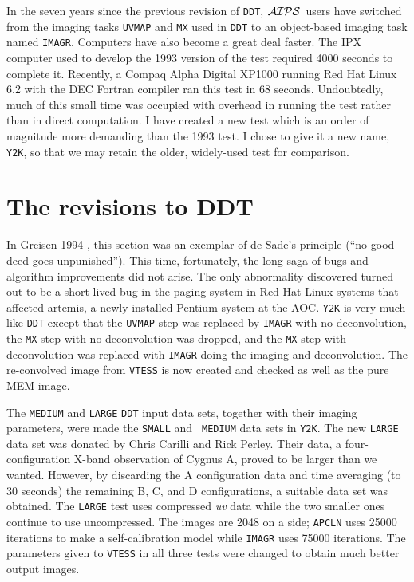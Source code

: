 \documentclass[twoside]{article}
\newcommand{\AIPS}{{$\cal AIPS\/$}}
\begin{document}
In the seven years since the previous revision of {\tt DDT}, \AIPS\
users have switched from the imaging tasks {\tt UVMAP} and {\tt MX}
used in {\tt DDT} to an object-based imaging task named {\tt IMAGR}\@.
Computers have also become a great deal faster.  The IPX computer used
to develop the 1993 version of the test required 4000 seconds to
complete it.  Recently, a Compaq Alpha Digital XP1000 running Red Hat
Linux 6.2 with the DEC Fortran compiler ran this test in 68 seconds.
Undoubtedly, much of this small time was occupied with overhead in
running the test rather than in direct computation.  I have created a
new test which is an order of magnitude more demanding than the 1993
test.  I chose to give it a new name, {\tt Y2K}, so that we may retain
the older, widely-used test for comparison.

\section{The revisions to DDT}

In Greisen 1994 \cite{kn:AM85}, this section was an exemplar of de
Sade's principle (``no good deed goes unpunished'').  This time,
fortunately, the long saga of bugs and algorithm improvements did not
arise.  The only abnormality discovered turned out to be a short-lived
bug in the paging system in Red Hat Linux systems that affected
artemis, a newly installed Pentium system at the AOC\@.  {\tt Y2K} is
very much like {\tt DDT} except that the {\tt UVMAP} step was replaced
by {\tt IMAGR} with no deconvolution, the {\tt MX} step with no
deconvolution was dropped, and the {\tt MX} step with deconvolution
was replaced with {\tt IMAGR} doing the imaging and deconvolution.
The re-convolved image from {\tt VTESS} is now created and checked as
well as the pure MEM image.

The {\tt MEDIUM} and {\tt LARGE} {\tt DDT} input data sets, together
with their imaging parameters, were made the {\tt SMALL} and {\tt
MEDIUM} data sets in {\tt Y2K}\@.  The new {\tt LARGE} data set was
donated by Chris Carilli and Rick Perley.  Their data, a
four-configuration X-band observation of Cygnus A, proved to be larger
than we wanted.  However, by discarding the A configuration data and
time averaging (to 30 seconds) the remaining B, C, and D
configurations, a suitable data set was obtained.  The {\tt LARGE}
test uses compressed {\it uv} data while the two smaller ones continue
to use uncompressed.  The images are 2048 on a side; {\tt APCLN} uses
25000 iterations to make a self-calibration model while {\tt IMAGR}
uses 75000 iterations.  The parameters given to {\tt VTESS} in all
three tests were changed to obtain much better output images.
\end{document}
